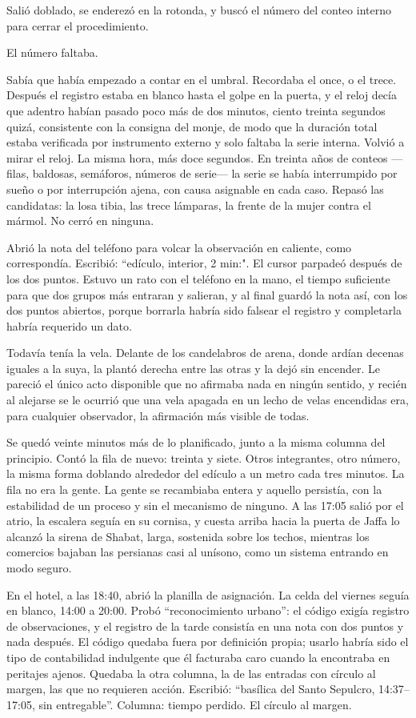 Salió doblado, se enderezó en la rotonda, y buscó el número del conteo interno para cerrar el procedimiento.

El número faltaba.

Sabía que había empezado a contar en el umbral. Recordaba el once, o el trece. Después el registro estaba en blanco hasta el golpe en la puerta, y el reloj decía que adentro habían pasado poco más de dos minutos, ciento treinta segundos quizá, consistente con la consigna del monje, de modo que la duración total estaba verificada por instrumento externo y solo faltaba la serie interna. Volvió a mirar el reloj. La misma hora, más doce segundos. En treinta años de conteos ---filas, baldosas, semáforos, números de serie--- la serie se había interrumpido por sueño o por interrupción ajena, con causa asignable en cada caso. Repasó las candidatas: la losa tibia, las trece lámparas, la frente de la mujer contra el mármol. No cerró en ninguna.

Abrió la nota del teléfono para volcar la observación en caliente, como correspondía. Escribió: ``edículo, interior, 2 min:". El cursor parpadeó después de los dos puntos. Estuvo un rato con el teléfono en la mano, el tiempo suficiente para que dos grupos más entraran y salieran, y al final guardó la nota así, con los dos puntos abiertos, porque borrarla habría sido falsear el registro y completarla habría requerido un dato.

Todavía tenía la vela. Delante de los candelabros de arena, donde ardían decenas iguales a la suya, la plantó derecha entre las otras y la dejó sin encender. Le pareció el único acto disponible que no afirmaba nada en ningún sentido, y recién al alejarse se le ocurrió que una vela apagada en un lecho de velas encendidas era, para cualquier observador, la afirmación más visible de todas.

Se quedó veinte minutos más de lo planificado, junto a la misma columna del principio. Contó la fila de nuevo: treinta y siete. Otros integrantes, otro número, la misma forma doblando alrededor del edículo a un metro cada tres minutos. La fila no era la gente. La gente se recambiaba entera y aquello persistía, con la estabilidad de un proceso y sin el mecanismo de ninguno. A las 17:05 salió por el atrio, la escalera seguía en su cornisa, y cuesta arriba hacia la puerta de Jaffa lo alcanzó la sirena de Shabat, larga, sostenida sobre los techos, mientras los comercios bajaban las persianas casi al unísono, como un sistema entrando en modo seguro.

En el hotel, a las 18:40, abrió la planilla de asignación. La celda del viernes seguía en blanco, 14:00 a 20:00. Probó ``reconocimiento urbano'': el código exigía registro de observaciones, y el registro de la tarde consistía en una nota con dos puntos y nada después. El código quedaba fuera por definición propia; usarlo habría sido el tipo de contabilidad indulgente que él facturaba caro cuando la encontraba en peritajes ajenos. Quedaba la otra columna, la de las entradas con círculo al margen, las que no requieren acción. Escribió: ``basílica del Santo Sepulcro, 14:37--17:05, sin entregable''. Columna: tiempo perdido. El círculo al margen.

